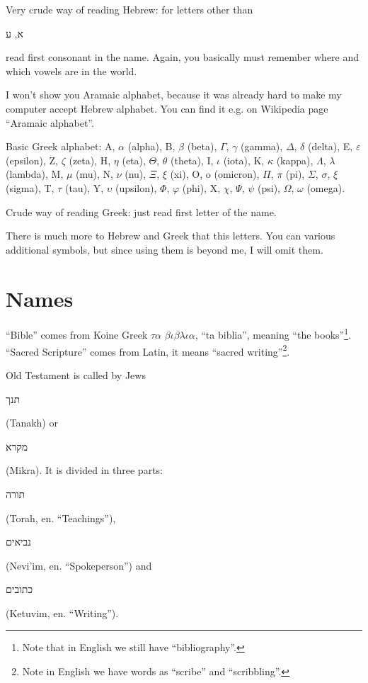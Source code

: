 \documentclass[a4paper,11pt]{article}
\begin{document}
Very crude way of reading Hebrew: for letters other than
\begin{hebrew} א, ע‎ \end{hebrew} read first consonant in the name. Again,
you basically must remember where and which vowels are in the world.

I won't show you Aramaic alphabet, because it was already hard to make my
computer accept Hebrew alphabet. You can find it e.g. on Wikipedia page
``Aramaic alphabet''.

Basic Greek alphabet: A, $\alpha$ (alpha), B, $\beta$ (beta), $\Gamma$, $\gamma$ (gamma),
$\Delta$, $\delta$ (delta), E, $\varepsilon$ (epsilon), Z, $\zeta$ (zeta), H, $\eta$ (eta), $\Theta$, $\theta$
(theta), I, $\iota$ (iota), K, $\kappa$ (kappa), $\Lambda$, $\lambda$ (lambda), M, $\mu$ (mu), N,
$\nu$ (nu), $\Xi$, $\xi$ (xi), O, o (omicron), $\Pi$, $\pi$ (pi), $\Sigma$, $\sigma$, $\xi$
(sigma), T, $\tau$ (tau), Y, $\upsilon$ (upsilon), $\Phi$, $\varphi$ (phi), X, $\chi$, $\Psi$, $\psi$
(psi), $\Omega$, $\omega$ (omega).

Crude way of reading Greek: just read first letter of the name.

There is much more to Hebrew and Greek that this letters. You can various
additional symbols, but since using them is beyond me, I will omit them.










\section{Names} %



``Bible'' comes from Koine Greek $\tau \alpha$ $\beta \iota \beta \lambda \iota \alpha$, ``ta biblia'', meaning
``the books''\footnote{Note that in English we still have
  ``bibliography''.}. ``Sacred Scripture'' comes from Latin, it means
``sacred writing''\footnote{Note in English we have words as ``scribe'' and
  ``scribbling''.}.

Old Testament is called by Jews \begin{hebrew} תנך \end{hebrew} (Tanakh) or
\begin{hebrew} מקרא \end{hebrew} (Mikra). It is divided in three parts:
\begin{hebrew} תורה \end{hebrew} (Torah, en. ``Teachings''),
\begin{hebrew} נביאים \end{hebrew} (Nevi'im, en. ``Spokeperson'') and
\begin{hebrew} כתובים \end{hebrew} (Ketuvim, en. ``Writing'').
\end{document}
